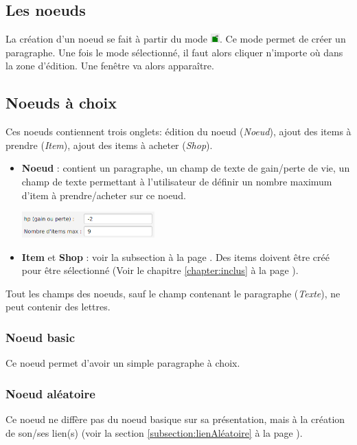 \begin{description}
	\section{Les noeuds}

		\label{chapter:noeuds}
		La création d'un noeud se fait à partir du mode \includegraphics[height=10pt]{img/modeEdition.png}. Ce mode permet de créer un paragraphe. Une fois le mode sélectionné, il faut alors cliquer n'importe où dans la zone d'édition. Une fenêtre va alors apparaître.

		\subsection{Noeuds à choix}
			Ces noeuds contiennent trois onglets: édition du noeud (\textit{Noeud}), ajout des items à prendre (\textit{Item}), ajout des items à acheter (\textit{Shop}).

			\begin{itemize}
				\item \textbf{Noeud} : contient un paragraphe, un champ de texte de gain/perte de vie, un champ de texte permettant à l'utilisateur de définir un nombre maximum d'item à prendre/acheter sur ce noeud.
				\begin{center}
					\includegraphics[height=1cm]{img/noeudBasic.png}
				\end{center}

				\item \textbf{Item} et \textbf{Shop} : voir la subsection   à la page \pageref{subsubsec:item_shop}. Des items doivent être créé pour être sélectionné (Voir le chapitre \ref{chapter:inclus} à la page \pageref{chapter:inclus}).
			\end{itemize}

			Tout les champs des noeuds, sauf le champ contenant le paragraphe (\textit{Texte}), ne peut contenir des lettres.

			\subsubsection{Noeud basic}
				Ce noeud permet d'avoir un simple paragraphe à choix.

			\subsubsection{Noeud aléatoire}
				Ce noeud ne diffère pas du noeud basique sur sa présentation, mais à la création de son/ses lien(s) (voir la section \ref{subsection:lienAléatoire} à la page \pageref{subsection:lienAléatoire}).


\end{description}
